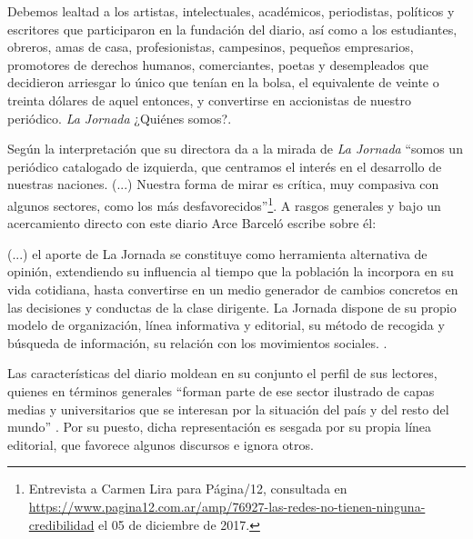 \documentclass[letterpaper, 11pt]{book}
\theoremstyle{definition}
\theoremstyle{remark}
\begin{document}
\begin{center}
    \begin{minipage}{0.9\linewidth}
        {\setlength{\parindent}{12pt}\small
	    Debemos lealtad a los artistas, intelectuales, académicos, periodistas, políticos y escritores que participaron en la
	    fundación del diario, así como a los estudiantes, obreros, amas de casa, profesionistas, campesinos, pequeños
	    empresarios, promotores de derechos humanos, comerciantes, poetas y desempleados que decidieron arriesgar lo único
	    que tenían en la bolsa, el equivalente de veinte o treinta dólares de aquel entonces, y convertirse en accionistas de
	    nuestro periódico.  \normalsize \emph{La Jornada} ¿Quiénes somos?.
        }
    \end{minipage}
\end{center}

Según la interpretación que su directora da a la mirada de \emph{La Jornada} ``somos un periódico catalogado de izquierda, que centramos el interés en el desarrollo de nuestras naciones. (...) Nuestra forma de mirar es crítica, muy compasiva con algunos sectores, como los más desfavorecidos''\footnote{Entrevista a Carmen Lira para Página/12, consultada en \\ \url{https://www.pagina12.com.ar/amp/76927-las-redes-no-tienen-ninguna-credibilidad} el 05 de diciembre de 2017.}. 
A rasgos generales y bajo un acercamiento directo con este diario Arce Barceló escribe sobre él:


\begin{center}
    \begin{minipage}{0.9\linewidth}
        {\setlength{\parindent}{12pt}\small
	    (...) el aporte de La Jornada se constituye como herramienta alternativa de opinión, extendiendo su influencia al tiempo que la población la incorpora en su vida cotidiana, hasta convertirse en un medio generador de cambios concretos en las decisiones y conductas de la clase dirigente. 
	    La Jornada dispone de su propio modelo de organización, línea informativa y editorial, su método de recogida y búsqueda de información, su relación con los movimientos sociales. \normalsize \citep[21]{2011_Tesis_LaJornada}.
        }
    \end{minipage}
\end{center}


Las características del diario moldean en su conjunto el perfil de sus lectores, quienes en términos generales ``forman parte de ese sector ilustrado de capas medias y universitarios que se interesan por la situación del país y del resto del mundo'' \citep[474]{2011_Tesis_LaJornada}. 
Por su puesto, dicha representación es sesgada por su propia línea editorial, que favorece algunos discursos e ignora otros.
\end{document}
